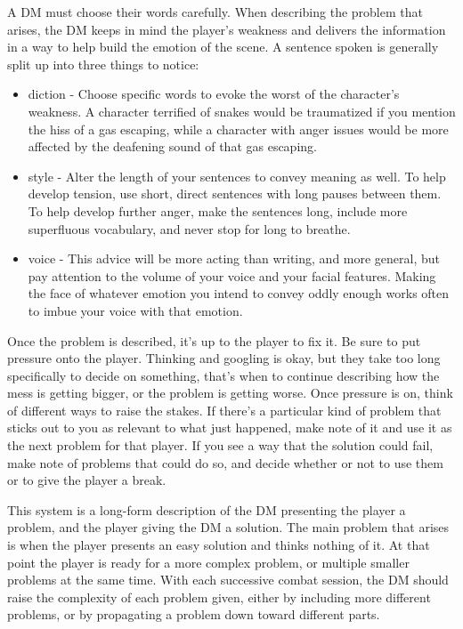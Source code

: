\documentclass[a4paper]{article}
\begin{document}
A DM must choose their words carefully. When describing the problem that arises, the DM keeps in mind the player's weakness and delivers the information in a way to help build the emotion of the scene. A sentence spoken is generally split up into three things to notice:
\begin{itemize}
\item diction - Choose specific words to evoke the worst of the character's weakness. A character terrified of snakes would be traumatized if you mention the hiss of a gas escaping, while a character with anger issues would be more affected by the deafening sound of that gas escaping.
\item style - Alter the length of your sentences to convey meaning as well. To help develop tension, use short, direct sentences with long pauses between them. To help develop further anger, make the sentences long, include more superfluous vocabulary, and never stop for long to breathe.
\item voice - This advice will be more acting than writing, and more general, but pay attention to the volume of your voice and your facial features. Making the face of whatever emotion you intend to convey oddly enough works often to imbue your voice with that emotion.
\end{itemize}

Once the problem is described, it's up to the player to fix it. Be sure to put pressure onto the player. Thinking and googling is okay, but they take too long specifically to decide on something, that's when to continue describing how the mess is getting bigger, or the problem is getting worse. Once pressure is on, think of different ways to raise the stakes. If there's a particular kind of problem that sticks out to you as relevant to what just happened, make note of it and use it as the next problem for that player. If you see a way that the solution could fail, make note of problems that could do so, and decide whether or not to use them or to give the player a break.

This system is a long-form description of the DM presenting the player a problem, and the player giving the DM a solution. The main problem that arises is when the player presents an easy solution and thinks nothing of it. At that point the player is ready for a more complex problem, or multiple smaller problems at the same time. With each successive combat session, the DM should raise the complexity of each problem given, either by including more different problems, or by propagating a problem down toward different parts.
\end{document}
